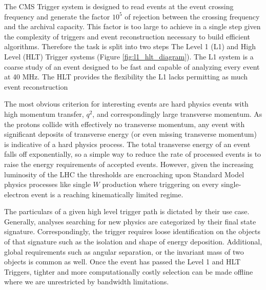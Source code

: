 {The CMS Trigger system is designed to read events at the event crossing frequency and generate the
 factor $10^5$ of rejection between the crossing frequency and the archival capacity. This factor 
is too large to achieve in a single step given the complexity of triggers and event reconstruction necessary
to build efficient algorithms. Therefore the task is split into two steps The Level 1 (L1) and High Level
 (HLT) Trigger systems (Figure \ref{fig:l1_hlt_diagram}). The L1 system is a coarse study of an event designed
 to be fast and capable of analyzing every event at 40 MHz. The HLT provides the flexibility the L1 lacks 
permitting as much event reconstruction 


The most obvious criterion for interesting events are hard physics events with high momentum transfer, $q^2$, and
correspondingly large transverse momentum.
 As the protons collide with effectively no transverse momentum, any event with significant deposits of 
transverse energy (or even missing transverse momentum) is indicative of a hard physics process. 
The total transverse energy of an event falls off exponentially, so a simple way to
reduce the rate of processed events is to raise the energy requirements of accepted events. However,
given the increasing luminosity of the LHC the thresholds are encroaching upon Standard Model physics processes
like single $W$ production where triggering on every single-electron event is a reaching kinematically limited regime. 

The particulars of a given high level trigger path is dictated by their use case. Generally, analyses 
searching for new physics are categorized by their final state signature. Correspondingly,
 the trigger requires loose identification 
on the objects of that signature such as the isolation and shape of energy deposition.  Additional,
global requirements such as angular separation, or the invariant mass of two objects is common as well.
Once the event has passed the Level 1 and HLT Triggers, tighter and more computationally 
costly selection can be made offline where we are unrestricted by bandwidth limitations. 

}

